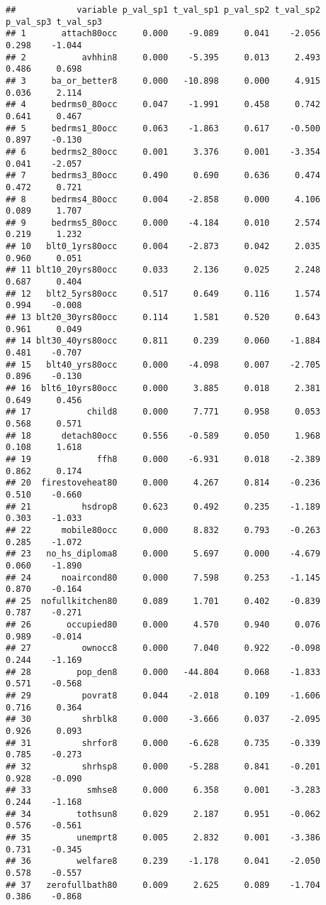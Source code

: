 \documentclass[
]{article}
\begin{document}
\begin{verbatim}
##            variable p_val_sp1 t_val_sp1 p_val_sp2 t_val_sp2 p_val_sp3 t_val_sp3
## 1       attach80occ     0.000    -9.089     0.041    -2.056     0.298    -1.044
## 2           avhhin8     0.000    -5.395     0.013     2.493     0.486     0.698
## 3     ba_or_better8     0.000   -10.898     0.000     4.915     0.036     2.114
## 4     bedrms0_80occ     0.047    -1.991     0.458     0.742     0.641     0.467
## 5     bedrms1_80occ     0.063    -1.863     0.617    -0.500     0.897    -0.130
## 6     bedrms2_80occ     0.001     3.376     0.001    -3.354     0.041    -2.057
## 7     bedrms3_80occ     0.490     0.690     0.636     0.474     0.472     0.721
## 8     bedrms4_80occ     0.004    -2.858     0.000     4.106     0.089     1.707
## 9     bedrms5_80occ     0.000    -4.184     0.010     2.574     0.219     1.232
## 10   blt0_1yrs80occ     0.004    -2.873     0.042     2.035     0.960     0.051
## 11 blt10_20yrs80occ     0.033     2.136     0.025     2.248     0.687     0.404
## 12   blt2_5yrs80occ     0.517     0.649     0.116     1.574     0.994    -0.008
## 13 blt20_30yrs80occ     0.114     1.581     0.520     0.643     0.961     0.049
## 14 blt30_40yrs80occ     0.811     0.239     0.060    -1.884     0.481    -0.707
## 15   blt40_yrs80occ     0.000    -4.098     0.007    -2.705     0.896    -0.130
## 16  blt6_10yrs80occ     0.000     3.885     0.018     2.381     0.649     0.456
## 17           child8     0.000     7.771     0.958     0.053     0.568     0.571
## 18      detach80occ     0.556    -0.589     0.050     1.968     0.108     1.618
## 19             ffh8     0.000    -6.931     0.018    -2.389     0.862     0.174
## 20  firestoveheat80     0.000     4.267     0.814    -0.236     0.510    -0.660
## 21          hsdrop8     0.623     0.492     0.235    -1.189     0.303    -1.033
## 22      mobile80occ     0.000     8.832     0.793    -0.263     0.285    -1.072
## 23   no_hs_diploma8     0.000     5.697     0.000    -4.679     0.060    -1.890
## 24      noaircond80     0.000     7.598     0.253    -1.145     0.870    -0.164
## 25  nofullkitchen80     0.089     1.701     0.402    -0.839     0.787    -0.271
## 26       occupied80     0.000     4.570     0.940     0.076     0.989    -0.014
## 27          ownocc8     0.000     7.040     0.922    -0.098     0.244    -1.169
## 28         pop_den8     0.000   -44.804     0.068    -1.833     0.571    -0.568
## 29          povrat8     0.044    -2.018     0.109    -1.606     0.716     0.364
## 30          shrblk8     0.000    -3.666     0.037    -2.095     0.926     0.093
## 31          shrfor8     0.000    -6.628     0.735    -0.339     0.785    -0.273
## 32          shrhsp8     0.000    -5.288     0.841    -0.201     0.928    -0.090
## 33           smhse8     0.000     6.358     0.001    -3.283     0.244    -1.168
## 34         tothsun8     0.029     2.187     0.951    -0.062     0.576    -0.561
## 35         unemprt8     0.005     2.832     0.001    -3.386     0.731    -0.345
## 36         welfare8     0.239    -1.178     0.041    -2.050     0.578    -0.557
## 37   zerofullbath80     0.009     2.625     0.089    -1.704     0.386    -0.868
\end{verbatim}
\end{document}
